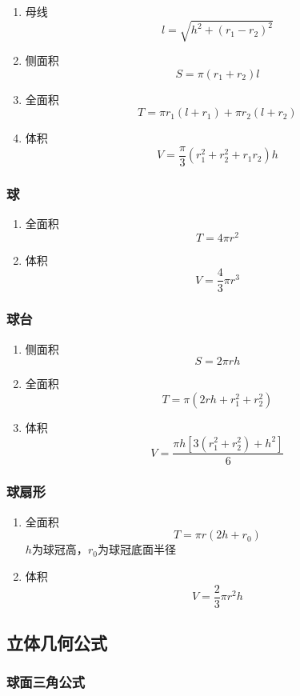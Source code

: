 \documentclass[a4paper]{article}
\begin{document}
\begin{enumerate}
	\item 母线
	$$l=\sqrt{h^2+(r_1-r_2)^2}$$
	\item 侧面积
	$$S=\pi(r_1+r_2)l$$
	\item 全面积
	$$T=\pi r_1(l+r_1)+\pi r_2(l+r_2)$$
	\item 体积
	$$V=\frac{\pi}{3}(r_1^2+r_2^2+r_1r_2)h$$
\end{enumerate}

\subsubsection{球}

\begin{enumerate}
	\item 全面积
	$$T=4\pi r^2$$
	\item 体积
	$$V=\frac{4}{3}\pi r^3$$
\end{enumerate}

\subsubsection{球台}

\begin{enumerate}
	\item 侧面积
	$$S=2\pi rh$$
	\item 全面积
	$$T=\pi(2rh+r_1^2+r_2^2)$$
	\item 体积
	$$V=\frac{\pi h[3(r_1^2+r_2^2)+h^2]}{6}$$
\end{enumerate}

\subsubsection{球扇形}

\begin{enumerate}
	\item 全面积
	$$T=\pi r(2h+r_0)$$
	$h$为球冠高，$r_0$为球冠底面半径
	\item 体积
	$$V=\frac{2}{3}\pi r^2h$$
\end{enumerate}

\subsection{立体几何公式}

\subsubsection{球面三角公式}
\end{document}
